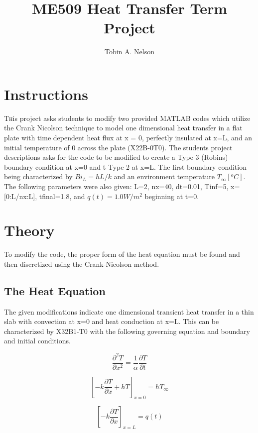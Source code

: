 \documentclass[conf]{new-aiaa}
\title{ME509 Heat Transfer Term Project}
\author{Tobin A. Nelson}
\affil{University of Alabama, Tuscaloosa, AL, 35487}
\begin{document}
\maketitle


\section{Instructions}
\lettrine{T}his project asks students to modify two provided MATLAB codes which utilize the Crank Nicolson technique to model one dimensional heat transfer in a flat plate with time dependent heat flux at x = 0, perfectly insulated at x=L, and an initial temperature of 0 across the plate (X22B-0T0). The students project descriptions asks for the code to be modified to create a Type 3 (Robins) boundary condition at x=0 and t Type 2 at x=L. The first boundary condition being characterized by $Bi_L=hL/k$ and an environment temperature $T_\infty [^oC]$. The following parameters were also given: L=2, nx=40, dt=0.01, T\textunderscore inf=5, x=[0:L/nx:L], t\textunderscore final=1.8, and $q(t)=1.0 W/m^2$ beginning at t=0. 
\section{Theory}
To modify the code, the proper form of the heat equation must be found and then discretized using the Crank-Nicolson method.
\subsection{The Heat Equation}
The given modifications indicate one dimensional transient heat transfer in a thin slab with convection at x=0 and heat conduction at x=L. This can be characterized by X32B1-T0 with the following governing equation and boundary and initial conditions.

\begin{equation}
\label{sample:equation}
   \frac{\partial^2 T}{\partial x^2}=\frac{1}{\alpha}\frac{\partial T}{\partial t}
\end{equation}

\begin{equation}
\label{sample:equation}
  \left[ -k\frac{\partial T}{\partial x}+hT\right]_{x=0}=hT_{\infty}
\end{equation}

\begin{equation}
\label{sample:equation}
  \left[ -k\frac{\partial T}{\partial x}\right]_{x=L}=q(t)
\end{equation}
\end{document}
